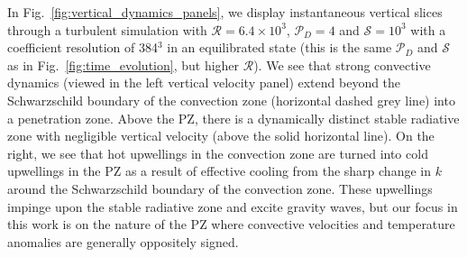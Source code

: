 \documentclass[twocolumn]{aastex631}
\newcommand{\mP}{\ensuremath{\mathcal{P}}}
\newcommand{\mR}{\ensuremath{\mathcal{R}}}
\newcommand{\mS}{\ensuremath{\mathcal{S}}}
\begin{document}
In Fig.~\ref{fig:vertical_dynamics_panels}, we display instantaneous vertical slices through a turbulent simulation with $\mR = 6.4 \times 10^3$, $\mP_D = 4$ and $\mS = 10^3$ with a coefficient resolution of 384$^3$ in an equilibrated state (this is the same $\mP_D$ and $\mS$ as in Fig.~\ref{fig:time_evolution}, but higher $\mR$).
We see that strong convective dynamics (viewed in the left vertical velocity panel) extend beyond the Schwarzschild boundary of the convection zone (horizontal dashed grey line) into a penetration zone.
Above the PZ, there is a dynamically distinct stable radiative zone with negligible vertical velocity (above the solid horizontal line).
On the right, we see that hot upwellings in the convection zone are turned into cold upwellings in the PZ as a result of effective cooling from the sharp change in $k$ around the Schwarzschild boundary of the convection zone.
These upwellings impinge upon the stable radiative zone and excite gravity waves, but our focus in this work is on the nature of the PZ where convective velocities and temperature anomalies are generally oppositely signed.
\end{document}
